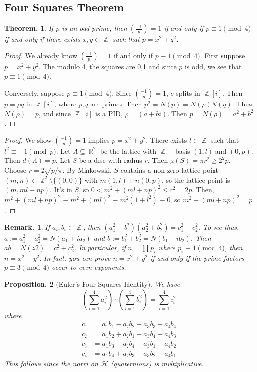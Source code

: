 \documentclass[11pt, a4paper]{memoir}
\DeclareMathOperator{\Z}{{\mathbb{Z}}}
\DeclareMathOperator{\R}{{\mathbb{R}}}
\theoremstyle{change}
\newtheorem{theorem}{Theorem.}[section]
\newtheorem{proposition}[theorem]{Proposition.}
\theoremstyle{plain}
\theoremstyle{nonumberplain}
\newtheorem{remark}{Remark.}
\newtheorem{proof}{Proof}
\newcommand{\lgs}[2]{\ensuremath{\left(\frac{#1}{#2}\right)}}
\numberwithin{equation}{section}
\begin{document}
\subsection{Four Squares Theorem}
\begin{theorem}
    If $p$ is an odd prime, then $\lgs{-1}{p}=1$ if and only if $p\equiv 1\pmod{4}$ if and only if there exists $x,y\in\Z$ such that $p=x^2+y^2$.
\end{theorem}
\begin{proof}
    We already know $\lgs{-1}{p}=1$ if and only if $p\equiv 1\pmod{4}$.
    First suppose $p=x^2+y^2$.
    The modulo 4, the squares are 0,1 and since $p$ is odd, we see that $p\equiv 1\pmod{4}$.

    Conversely, suppose $p\equiv 1\pmod{4}$.
    Since $\lgs{-1}{p}=1$, $p$ splits in $\Z[i]$.
    Then $p=\rho q$ in $\Z[i]$, where $p,q$ are primes.
    Then $p^2=N(p)=N(\rho)N(q)$.
    Thus $N(\rho)=p$, and since $\Z[i]$ is a PID, $\rho=(a+bi)$.
    Then $p=N(\rho)=a^2+b^2$.
\end{proof}
\begin{proof}
    We show $\lgs{-1}{p}=1$ implies $p=x^2+y^2$.
    There exists $l\in\Z$ such that $l^2\equiv -1\pmod{p}$.
    Let $\Lambda\subseteq\R^2$ be the lattice with $\Z-$basis $(1,l)$ and $(0,p)$.
    Then $d(\Lambda)=p$.
    Let $S$ be a disc with radius $r$.
    Then $\mu(S)=\pi r^2\geq 2^2p$.
    Choose $r=2\sqrt{p/\pi}$.
    By Minkowski, $S$ contains a non-zero lattice point $(m,n)\in\Z^2\setminus\{(0,0)\}$ with $m(1,l)+n(0,p)$, so the lattice point is $(m,ml+np)$.
    It's in $S$, so $0<m^2+(ml+np)^2\leq r^2=2p$.
    Then, $m^2+(ml+np)^2\equiv m^2+(ml)^2\equiv m^2(1+l^2)\equiv 0$, so $m^2+(ml+np)^2=p$.
\end{proof}
\begin{remark}
    If $a_i,b_i\in\Z$, then $(a_1^2+b_1^2)(a_2^2+b_2^2)=c_1^2+c_2^2$.
    To see thus, $a:=a_1^2+a_2^2=N(a_1+ia_2)$ and $b:=b_1^2+b_2^2=N(b_1+ib_2)$.
    Then $ab=N(z2)=c_1^2+c_2^2$.
    In particular, if $n=\prod p_i$ where $p_i\equiv 1\pmod{4}$, then $n=x^2+y^2$.
    In fact, you can prove $n=x^2+y^2$ if and only if the prime factors $p\equiv 3\pmod{4}$ occur to even exponents.
\end{remark}
\begin{proposition}[Euler's Four Squares Identity]
    We have
    \begin{equation*}
        \left(\sum_{i=1}^4 a_i^2\right)\cdot\left(\sum_{i=1}^4 b_i^2\right)=\sum_{i=1}^4 c_i^2
    \end{equation*}
    where
    \begin{align*}
        c_1 &= a_1b_1-a_2b_2-a_3b_3-a_4b_4\\
        c_2 &= a_1b_2+a_2b_1+a_3b_4-a_4b_3\\
        c_3 &= a_1b_3-a_2b_4+a_3b_1+a_4b_2\\
        c_4 &= a_1b_4+a_2b_3-a_3b_2+a_4b_1
    \end{align*}
    This follows since the norm on $\mathcal{H}$ (quaternions) is multiplicative.
\end{proposition}
\end{document}

